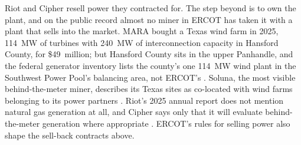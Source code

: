 Riot and Cipher resell power they contracted for. The step beyond is to own the plant, and on the public record almost no miner in ERCOT has taken it with a plant that sells into the market. MARA bought a Texas wind farm in 2025, 114~MW of turbines with 240~MW of interconnection capacity in Hansford County, for \$49~million; but Hansford County sits in the upper Panhandle, and the federal generator inventory lists the county's one 114~MW wind plant in the Southwest Power Pool's balancing area, not ERCOT's \autocite{mara10k2025,eia860m2026}. %
Soluna, the most visible behind-the-meter miner, describes its Texas sites as co-located with wind farms belonging to its power partners \autocite{soluna10k2025}. %
Riot's 2025 annual report does not mention natural gas generation at all, and Cipher says only that it will evaluate behind-the-meter generation where appropriate \autocite{riot10k2025,cipher10k2025}. %
ERCOT's rules for selling power also shape the sell-back contracts above.

